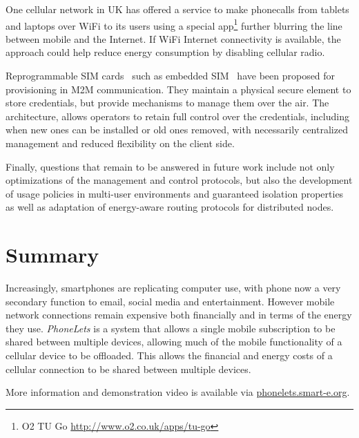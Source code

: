 \documentclass{sig-alternate-10pt}
\begin{document}
One cellular network in UK has offered a service to make phonecalls from tablets and laptops over WiFi to its users using a special app\footnote{O2 TU Go \url{http://www.o2.co.uk/apps/tu-go}} further blurring the line between mobile and the Internet. If WiFi Internet connectivity is available, the approach could help reduce energy consumption by disabling cellular radio.

Reprogrammable SIM cards~\cite{OFcom:2012tx} such as embedded SIM~\cite{Association:2013ub} have been proposed for provisioning in M2M communication. They maintain a physical secure element to store credentials, but provide mechanisms to manage them over the air. The architecture, allows operators to retain full control over the credentials, including when new ones can be installed or old ones removed, with necessarily centralized management and reduced flexibility on the client side.

Finally, questions that remain to be answered in future work include not only optimizations of the management and control protocols, but also the development of usage policies in multi-user environments and guaranteed isolation properties as well as adaptation of energy-aware routing protocols for distributed nodes.

\section{Summary}

Increasingly, smartphones are replicating computer use, with phone now a very secondary function to email, social media and entertainment. However mobile network connections remain expensive both financially and in terms of the energy they use. \emph{PhoneLets} is a system that allows a single mobile subscription to be shared between multiple devices, allowing much of the mobile functionality of a cellular device to be offloaded. This allows the financial and energy costs of a cellular connection to be shared between multiple devices.

More information and demonstration video is available via \url{phonelets.smart-e.org}.

\end{document}
